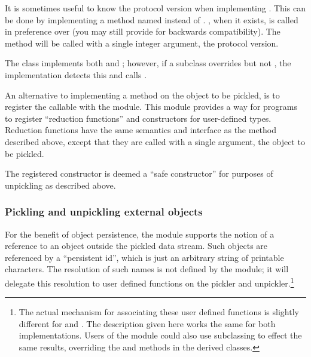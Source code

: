 It is sometimes useful to know the protocol version when implementing
.  This can be done by implementing a method named
 instead of .
, when it exists, is called in preference over
 (you may still provide  for
backwards compatibility).  The  method will be
called with a single integer argument, the protocol version.

The  class implements both  and
; however, if a subclass overrides
 but not , the
 implementation detects this and calls
.

An alternative to implementing a  method on the
object to be pickled, is to register the callable with the
 module.  This module provides a way
for programs to register ``reduction functions'' and constructors for
user-defined types.   Reduction functions have the same semantics and
interface as the  method described above, except
that they are called with a single argument, the object to be pickled.

The registered constructor is deemed a ``safe constructor'' for purposes
of unpickling as described above.


\subsubsection{Pickling and unpickling external objects}

For the benefit of object persistence, the  module
supports the notion of a reference to an object outside the pickled
data stream.  Such objects are referenced by a ``persistent id'',
which is just an arbitrary string of printable \ASCII{} characters.
The resolution of such names is not defined by the 
module; it will delegate this resolution to user defined functions on
the pickler and unpickler.\footnote{The actual mechanism for
associating these user defined functions is slightly different for
 and .  The description given here
works the same for both implementations.  Users of the 
module could also use subclassing to effect the same results,
overriding the  and 
methods in the derived classes.}

